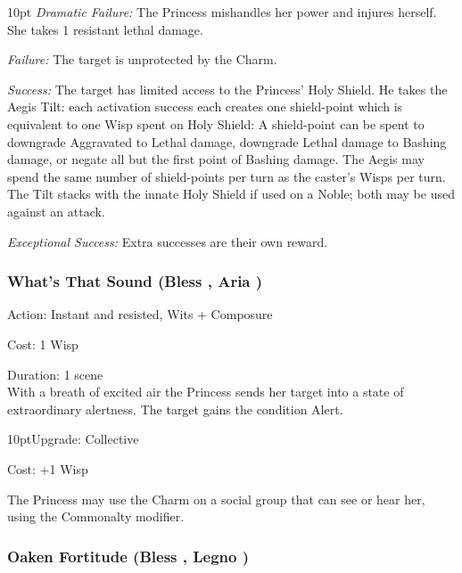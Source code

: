 \begin{myindentpar}{10pt}    \emph{Dramatic Failure:} The Princess mishandles her power and injures herself. She takes 1 resistant lethal damage.

\emph{Failure:} The target is unprotected by the Charm. 

\emph{Success:} The target has limited access to the Princess’ Holy Shield. He takes the Aegis Tilt: each activation success each creates one shield-point which is equivalent to one Wisp spent on Holy Shield: A shield-point can be spent to downgrade Aggravated to Lethal damage, downgrade Lethal damage to Bashing damage, or negate all but the first point of Bashing damage. The Aegis may spend the same number of shield-points per turn as the caster's Wisps per turn. The Tilt stacks with the innate Holy Shield if used on a Noble; both may be used against an attack. 

\emph{Exceptional Success:} Extra successes are their own reward. \end{myindentpar}




\subsubsection*{What's That Sound (Bless \textbullet\textbullet\textbullet, Aria \textbullet\textbullet)}

\noindent Action: Instant and resisted, Wits + Composure

\noindent Cost: 1 Wisp

\noindent Duration: 1 scene \\

\noindent With a breath of excited air the Princess sends her target into a state of extraordinary alertness. The target gains the condition Alert. 

\begin{myindentpar}{10pt}Upgrade: Collective

\noindent Cost: +1 Wisp

The Princess may use the Charm on a social group that can see or hear her, using the Commonalty modifier. 
\end{myindentpar}

\subsubsection*{Oaken Fortitude (Bless \textbullet\textbullet\textbullet, Legno \textbullet)}

